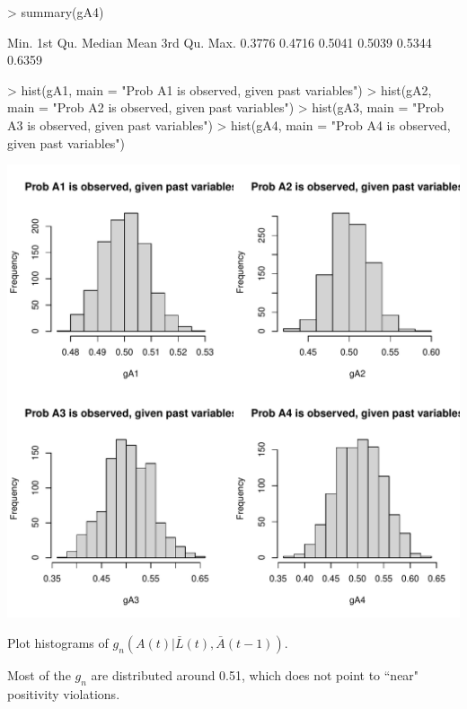 \documentclass[answers]{exam}
\newenvironment{myfigure}{\captionsetup{type=mytype}}{}
\begin{document}
\begin{enumerate}
\begin{solution}
\begin{Schunk}
\begin{Sinput}
> summary(gA4)
\end{Sinput}
\begin{Soutput}
   Min. 1st Qu.  Median    Mean 3rd Qu.    Max. 
 0.3776  0.4716  0.5041  0.5039  0.5344  0.6359 
\end{Soutput}
\begin{Sinput}
> hist(gA1, main = "Prob A1 is observed, given past variables")
> hist(gA2, main = "Prob A2 is observed, given past variables")
> hist(gA3, main = "Prob A3 is observed, given past variables")
> hist(gA4, main = "Prob A4 is observed, given past variables")
\end{Sinput}
\end{Schunk}
\begin{myfigure}
\begin{center}
\includegraphics[width=.4\textwidth]{gHist2.pdf}
\caption{Plot histograms of $g_n(A(t)|\bar{L}(t), \bar{A}(t-1))$. }
\label{Fig:gHist2}
\end{center}
\end{myfigure}

Most of the $g_n$ are distributed around 0.51, which does not point to ``near" positivity violations.


\end{solution}
\end{enumerate}
\end{document}
